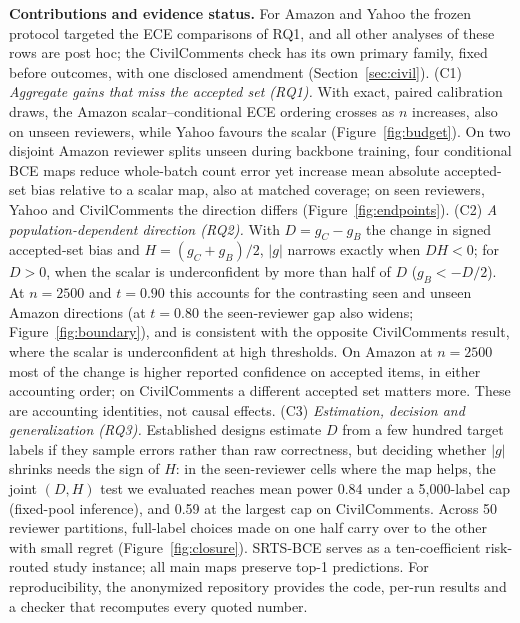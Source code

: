 \documentclass[sigconf,anonymous,review]{acmart}
\begin{document}
\textbf{Contributions and evidence status.} For Amazon and Yahoo the
frozen protocol targeted the ECE comparisons of RQ1, and all other
analyses of these rows are post hoc; the CivilComments check has its own
primary family, fixed before outcomes, with one disclosed amendment
(Section~\ref{sec:civil}). (C1) \emph{Aggregate gains that miss the
accepted set (RQ1).} With exact, paired calibration draws, the Amazon
scalar--conditional ECE ordering crosses as $n$ increases, also on
unseen reviewers, while Yahoo favours the scalar
(Figure~\ref{fig:budget}). On two disjoint Amazon reviewer splits unseen
during backbone training, four conditional BCE maps reduce whole-batch
count error yet increase mean absolute accepted-set bias relative to a
scalar map, also at matched coverage; on seen reviewers, Yahoo and
CivilComments the direction differs (Figure~\ref{fig:endpoints}). (C2)
\emph{A population-dependent direction (RQ2).} With $D=g_C-g_B$
the change in signed accepted-set bias and $H=(g_C+g_B)/2$, $|g|$ narrows
exactly when $DH<0$; for $D>0$, when the scalar is
underconfident by more than half of $D$ ($g_B<-D/2$). At $n{=}2500$ and $t{=}0.90$ this accounts for the contrasting seen and
unseen Amazon directions (at $t{=}0.80$ the seen-reviewer gap also widens;
Figure~\ref{fig:boundary}), and is consistent with the opposite
CivilComments result, where the scalar is
underconfident at high thresholds. On Amazon at $n{=}2500$ most of the
change is higher reported confidence on accepted items, in either accounting
order; on CivilComments a different accepted set matters
more. These are accounting identities, not causal effects. (C3) \emph{Estimation, decision and generalization (RQ3).}
Established designs estimate $D$ from a few hundred target labels if they
sample errors rather than raw correctness, but deciding whether $|g|$
shrinks needs the sign of $H$: in the seen-reviewer cells where the map
helps, the joint $(D,H)$ test we evaluated reaches mean power 0.84 under
a 5{,}000-label cap (fixed-pool inference), and 0.59 at the largest cap
on CivilComments.
Across 50 reviewer partitions, full-label choices made on one half carry
over to the other with small regret (Figure~\ref{fig:closure}).
SRTS-BCE serves as a ten-coefficient risk-routed study instance; all main
maps preserve top-1 predictions. For reproducibility, the anonymized
repository provides the code, per-run results and a checker that
recomputes every quoted number.
\end{document}
